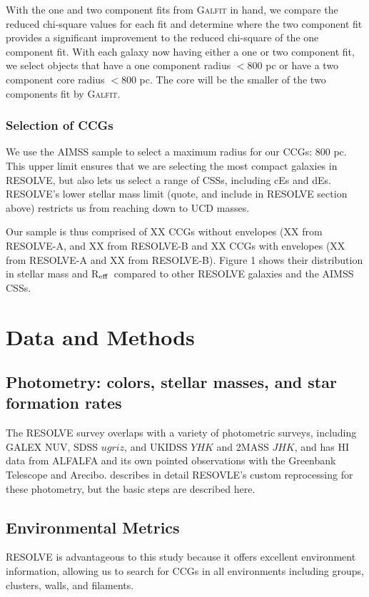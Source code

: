 \documentclass[iop,apj,twocolappendix]{emulateapj}
\newcommand{\Reff}{R$_{\rm eff}$}
\begin{document}
With the one and two component fits from \textsc{Galfit} in hand, we compare the reduced chi-square values for each fit and determine where the two component fit provides a significant improvement to the reduced chi-square of the one component fit. With each galaxy now having either a one or two component fit, we select objects that have a one component radius $<800$ pc  or have a two component core radius $<800$ pc. The core will be the smaller of the two components fit by \textsc{Galfit}. 

\subsubsection{Selection of CCGs}
\label{ccgsel}

\noindent We use the AIMSS sample to select a maximum radius for our CCGs: 800 pc. This upper limit ensures that we are selecting the most compact galaxies in RESOLVE, but also lets us select a range of CSSs, including cEs and dEs. RESOLVE's lower stellar mass limit (quote, and include in RESOLVE section above) restricts us from reaching down to UCD masses.

Our sample is thus comprised of XX CCGs without envelopes (XX from RESOLVE-A, and XX from RESOLVE-B and XX CCGs with envelopes (XX from RESOLVE-A and XX from RESOLVE-B). Figure 1 shows their distribution in stellar mass and \Reff\ compared to other RESOLVE galaxies and the AIMSS CSSs. 

\section{Data and Methods}
\label{methods}

\subsection{Photometry: colors, stellar masses, and star formation rates}
\label{phot}
\noindent The RESOLVE survey overlaps with a variety of photometric surveys, including GALEX NUV, SDSS $ugriz$, and UKIDSS $YHK$ and 2MASS $JHK$, and has HI data from ALFALFA and its own pointed observations with the Greenbank Telescope and Arecibo. \citet{Eckert2015} describes in detail RESOVLE's custom reprocessing for these photometry, but the basic steps are described here.

\subsection{Environmental Metrics}
\label{env}
\noindent RESOLVE is advantageous to this study because it offers excellent environment information, allowing us to search for CCGs in all environments including groups, clusters, walls, and filaments. \citet{Moffett2015} 
\end{document}
